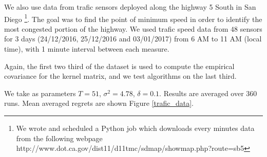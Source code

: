 \documentclass{article} %
\begin{document}
We also use data from trafic sensors deployed along the highway 5 South in San Diego \footnote{We wrote and scheduled a Python job which downloads every minutes data from the following webpage http://www.dot.ca.gov/dist11/d11tmc/sdmap/showmap.php?route=sb5}. The goal was to find the point of minimum speed in order to identify the most congested portion of the highway. We used trafic speed data from $48$ sensors for 3 days (24/12/2016, 25/12/2016 and 03/01/2017) from 6 AM to 11 AM (local time), with 1 minute interval between each measure.

Again, the first two third of the dataset is used to compute the empirical covariance for the kernel matrix, and we test algorithms on the last third.

We take as parameters $T=51$, $\sigma^2=4.78$, $\delta = 0.1$. Results are averaged over $360$ runs. Mean averaged regrets are shown Figure \ref{trafic_data}.

\end{document}
